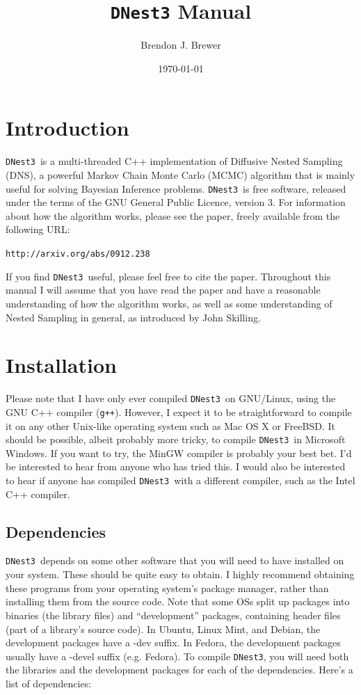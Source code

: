 \documentclass[a4paper, 11pt]{article}
\title{{\tt DNest3} Manual}
\author{Brendon J. Brewer}
\date{\today}
\newcommand{\dnest}{{\tt DNest3}}
\begin{document}
\maketitle

\section{Introduction}

\dnest~is a multi-threaded C++ implementation of Diffusive Nested Sampling
(DNS), a powerful Markov Chain Monte Carlo (MCMC) algorithm that is mainly
useful for solving Bayesian Inference problems.
\dnest~is free software,
released under the terms of the GNU General Public Licence, version 3.
For information about how the
algorithm works, please see the paper, freely available from the following
URL:\\

\begin{center}
{\tt http://arxiv.org/abs/0912.238}
\end{center}

If you find \dnest~useful, please feel free to cite the paper.
Throughout this manual I will assume that you have read the paper and have a
reasonable understanding of how the algorithm works, as well as some
understanding of Nested Sampling in general, as introduced by John Skilling.\\

\section{Installation}
Please note that I have only ever compiled \dnest~on GNU/Linux,
using the GNU C++ compiler ({\tt g++}). However, I expect it to be
straightforward to compile it on any other Unix-like operating system such as Mac
OS X or FreeBSD. It should be possible, albeit probably more tricky,
to compile \dnest~in Microsoft Windows. If you want to try,
the MinGW compiler is
probably your best bet. I'd be interested to hear from anyone who
has tried this. I would also be interested to hear if anyone has
compiled \dnest~with a different compiler, such as the Intel C++
compiler.\\

\subsection{Dependencies}
\dnest~depends on some other software that you will need to have installed on
your system. These should be quite easy to obtain. I highly
recommend obtaining these programs from your operating system's package manager,
rather than installing them from the source code. Note that some OSs split up
packages into binaries (the library files) and ``development'' packages,
containing header files (part of a library's source code).
In Ubuntu, Linux Mint, and Debian, the development packages have a -dev suffix.
In Fedora, the development packages usually have a -devel suffix (e.g. Fedora).
To compile \dnest, you will need both the libraries and the development packages
for each of the dependencies. Here's a list of dependencies:\\
\end{document}
